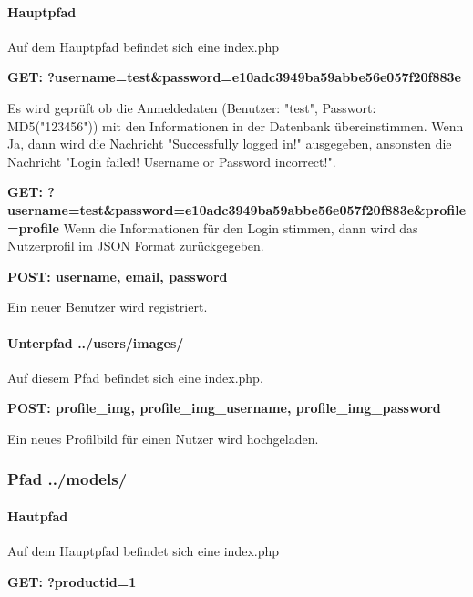 \documentclass{scrartcl}
\begin{document}
\paragraph{Hauptpfad} 
Auf dem Hauptpfad befindet sich eine index.php \newline 

\noindent \textbf{GET: ?username=test\&password=e10adc3949ba59abbe56e057f20f883e}

\noindent Es wird geprüft ob die Anmeldedaten (Benutzer: "test", Passwort: MD5("123456")) mit den Informationen in der Datenbank übereinstimmen. Wenn Ja, dann wird die Nachricht "Successfully logged in!" ausgegeben, ansonsten die Nachricht "Login failed! Username or Password incorrect!". \newline

\noindent \textbf{GET: ?username=test\&password=e10adc3949ba59abbe56e057f20f883e\&profile=profile}
Wenn die Informationen für den Login stimmen, dann wird das Nutzerprofil im JSON Format zurückgegeben. \newline

\noindent \textbf{POST: username, email, password}

\noindent Ein neuer Benutzer wird registriert. \newline 

\paragraph{Unterpfad ../users/images/}

Auf diesem Pfad befindet sich eine index.php. \newline 

\noindent \textbf{POST: profile\_img, profile\_img\_username, profile\_img\_password}

\noindent Ein neues Profilbild für einen Nutzer wird hochgeladen.


\subsubsection{Pfad ../models/}

\paragraph{Hautpfad}
 
Auf dem Hauptpfad befindet sich eine index.php \newline 

\noindent \textbf{GET: ?productid=1}
\end{document}
